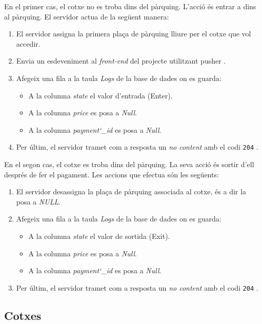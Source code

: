 En el primer cas, el cotxe no es troba dins del pàrquing. L'acció és entrar a dins al pàrquing.
El servidor actua de la següent manera:
\begin{enumerate}
    \item El servidor assigna la primera plaça de pàrquing lliure per el cotxe que vol accedir.
    \item Envia un esdeveniment al \emph{front-end} del projecte utilitzant pusher \autocite{pusher}.
    \item Afegeix una fila a la taula \emph{Logs} de la base de dades on es guarda:
    \begin{itemize}
        \item A la columna \emph{state} el valor d'entrada (Enter).
        \item A la columna \emph{price} es posa a \emph{Null}.
        \item A la columna \emph{payment\char`_id} es posa a \emph{Null}.
    \end{itemize}
    \item Per últim, el servidor tramet com a resposta un \emph{no content} amb el codi \texttt{204} \autocite{http_204_response}.
\end{enumerate}

En el segon cas, el cotxe es troba dins del pàrquing. La seva acció és sortir d'ell després de fer el pagament.
Les accions que efectua són les següents:
\begin{enumerate}
    \item El servidor desassigna la plaça de pàrquing associada al cotxe, és a dir la posa a \emph{NULL}.
    \item Afegeix una fila a la taula \emph{Logs} de la base de dades on es guarda:
    \begin{itemize}
        \item A la columna \emph{state} el valor de sortida (Exit).
        \item A la columna \emph{price} es posa a \emph{Null}.
        \item A la columna \emph{payment\char`_id} es posa a \emph{Null}.
    \end{itemize}
    \item Per últim, el servidor tramet com a resposta un \emph{no content} amb el codi \texttt{204} \autocite{http_204_response}.
\end{enumerate}


\subsection{Cotxes}

